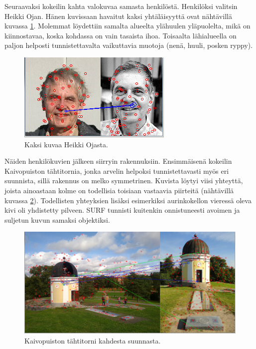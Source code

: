 \documentclass[12pt,a4paper,titlepage]{article}
\begin{document}
Seuraavaksi kokeilin kahta valokuvaa samasta henkilöstä. Henkilöksi valitsin Heikki Ojan. Hänen kuvissaan havaitut kaksi yhtäläisyyttä ovat nähtävillä kuvassa \ref{heikkiseta}. Molemmat löydettiin samalta alueelta ylähuulen yläpuolelta, mikä on kiinnostavaa, koska kohdassa on vain tasaista ihoa. Toisaalta lähialueella on paljon helposti tunnistettavalta vaikuttavia muotoja (nenä, huuli, posken ryppy).

\begin{figure}
\centering 
\includegraphics[width=\textwidth]{kuvat/heikkiseta.jpg}
\caption{Kaksi kuvaa Heikki Ojasta.}
\label{heikkiseta}
\end{figure}

Näiden henkilökuvien jälkeen siirryin rakennuksiin. Ensimmäisenä kokeilin Kaivopuiston tähtitornia, jonka arvelin helpoksi tunnistettavasti myös eri suunnista, sillä rakennus on melko symmetrinen. Kuvista löytyi viisi yhteyttä, joista ainoastaan kolme on todellisia toisiaan vastaavia piirteitä (nähtävillä kuvassa \ref{kaivopuisto}). Todellisten yhteyksien lisäksi esimerkiksi aurinkokellon vieressä oleva kivi oli yhdistetty pilveen. SURF tunnisti kuitenkin onnistuneesti avoimen ja suljetun kuvun samaksi objektiksi.

\begin{figure}
\centering 
\includegraphics[width=\textwidth]{kuvat/kaivopuisto.jpg}
\caption{Kaivopuiston tähtitorni kahdesta suunnasta.}
\label{kaivopuisto}
\end{figure}
\end{document}
